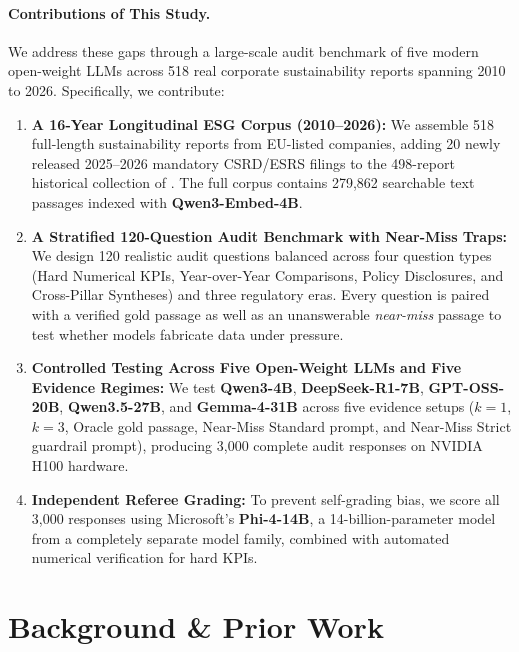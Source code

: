 \documentclass[11pt,letterpaper]{article}
\newcommand{\model}[1]{\textbf{#1}}
\begin{document}
\paragraph{Contributions of This Study.}
We address these gaps through a large-scale audit benchmark of five modern open-weight LLMs across 518 real corporate sustainability reports spanning 2010 to 2026. Specifically, we contribute:
\begin{enumerate}[leftmargin=1.5em, itemsep=2pt]
  \item \textbf{A 16-Year Longitudinal ESG Corpus (2010--2026):} We assemble 518 full-length sustainability reports from EU-listed companies, adding 20 newly released 2025--2026 mandatory CSRD/ESRS filings to the 498-report historical collection of \citet{saad2026empirical}. The full corpus contains 279,862 searchable text passages indexed with \model{Qwen3-Embed-4B}.
  \item \textbf{A Stratified 120-Question Audit Benchmark with Near-Miss Traps:} We design 120 realistic audit questions balanced across four question types (Hard Numerical KPIs, Year-over-Year Comparisons, Policy Disclosures, and Cross-Pillar Syntheses) and three regulatory eras. Every question is paired with a verified gold passage as well as an unanswerable \textit{near-miss} passage to test whether models fabricate data under pressure.
  \item \textbf{Controlled Testing Across Five Open-Weight LLMs and Five Evidence Regimes:} We test \model{Qwen3-4B}, \model{DeepSeek-R1-7B}, \model{GPT-OSS-20B}, \model{Qwen3.5-27B}, and \model{Gemma-4-31B} across five evidence setups ($k=1$, $k=3$, Oracle gold passage, Near-Miss Standard prompt, and Near-Miss Strict guardrail prompt), producing 3,000 complete audit responses on NVIDIA H100 hardware.
  \item \textbf{Independent Referee Grading:} To prevent self-grading bias, we score all 3,000 responses using Microsoft's \model{Phi-4-14B}, a 14-billion-parameter model from a completely separate model family, combined with automated numerical verification for hard KPIs.
\end{enumerate}

\section{Background \& Prior Work}
\label{sec:sota}
\end{document}
